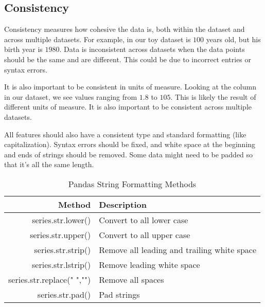 \subsection*{Consistency}
Consistency measures how cohesive the data is, both within the dataset and across multiple datasets.
For example, in our toy dataset  is $100$ years old, but his birth year is $1980$.
Data is inconsistent across datasets when the data points should be the same and are different.
This could be due to incorrect entries or syntax errors.

It is also important to be consistent in units of measure.
Looking at the  column in our dataset, we see values ranging from $1.8$ to $105$.
This is likely the result of different units of measure.  
It is also important to be consistent across multiple datasets. 

All features should also have a consistent type and standard formatting (like capitalization).
Syntax errors should be fixed, and white space at the beginning and ends of strings should be removed.
Some data might need to be padded so that it's all the same length.


\begin{table}[H]

\centering
  \begin{tabular}{r|l}
	Method & Description \\
	\hline
	series.str.lower() & Convert to all lower case\\
	series.str.upper() & Convert to all upper case\\
	series.str.strip() & Remove all leading and trailing white space\\
	series.str.lstrip() & Remove leading white space\\
	series.str.replace(" ","")& Remove all spaces\\
	series.str.pad() & Pad strings\\
	\end{tabular}
\caption{Pandas String Formatting Methods}
\end{table}


